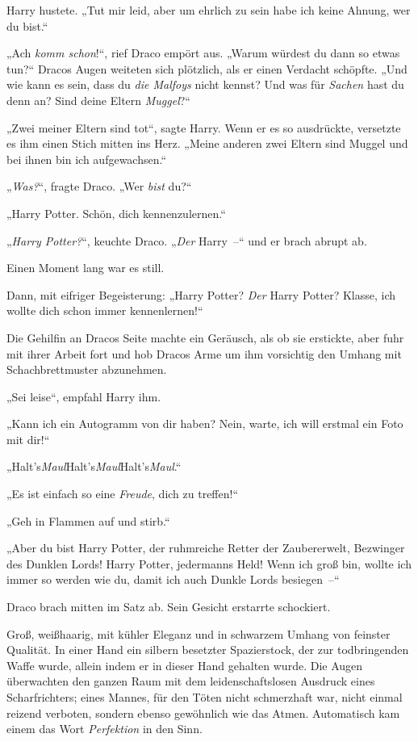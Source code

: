 {Harry hustete. „Tut mir leid, aber um ehrlich zu sein habe ich keine Ahnung, wer du bist.“

„Ach \emph{komm schon}!“, rief Draco empört aus. „Warum würdest du dann so etwas tun?“ Dracos Augen weiteten sich plötzlich, als er einen Verdacht schöpfte. „Und wie kann es sein, dass du \emph{die Malfoys} nicht kennst? Und was für \emph{Sachen} hast du denn an? Sind deine Eltern \emph{Muggel}?“

„Zwei meiner Eltern sind tot“, sagte Harry. Wenn er es so ausdrückte, versetzte es ihm einen Stich mitten ins Herz. „Meine anderen zwei Eltern sind Muggel und bei ihnen bin ich aufgewachsen.“

„\emph{Was?}“, fragte Draco. „Wer \emph{bist} du?“

„Harry Potter. Schön, dich kennenzulernen.“

„\emph{Harry Potter?}“, keuchte Draco. „\emph{Der} Harry~--“ und er brach abrupt ab.

Einen Moment lang war es still.

Dann, mit eifriger Begeisterung: „Harry Potter? \emph{Der} Harry Potter? Klasse, ich wollte dich schon immer kennenlernen!“

Die Gehilfin an Dracos Seite machte ein Geräusch, als ob sie erstickte, aber fuhr mit ihrer Arbeit fort und hob Dracos Arme um ihm vorsichtig den Umhang mit Schachbrettmuster abzunehmen.

„Sei leise“, empfahl Harry ihm.

„Kann ich ein Autogramm von dir haben? Nein, warte, ich will erstmal ein Foto mit dir!“

„Halt's\emph{Maul}Halt's\emph{Maul}Halt's\emph{Maul}.“

„Es ist einfach so eine \emph{Freude}, dich zu treffen!“

„Geh in Flammen auf und stirb.“

„Aber du bist Harry Potter, der ruhmreiche Retter der Zaubererwelt, Bezwinger des Dunklen Lords! Harry Potter, jedermanns Held! Wenn ich groß bin, wollte ich immer so werden wie du, damit ich auch Dunkle Lords besiegen~--“

Draco brach mitten im Satz ab. Sein Gesicht erstarrte schockiert.

Groß, weißhaarig, mit kühler Eleganz und in schwarzem Umhang von feinster Qualität. In einer Hand ein silbern besetzter Spazierstock, der zur todbringenden Waffe wurde, allein indem er in dieser Hand gehalten wurde. Die Augen überwachten den ganzen Raum mit dem leidenschaftslosen Ausdruck eines Scharfrichters; eines Mannes, für den Töten nicht schmerzhaft war, nicht einmal reizend verboten, sondern ebenso gewöhnlich wie das Atmen. Automatisch kam einem das Wort \emph{Perfektion} in den Sinn.

}
